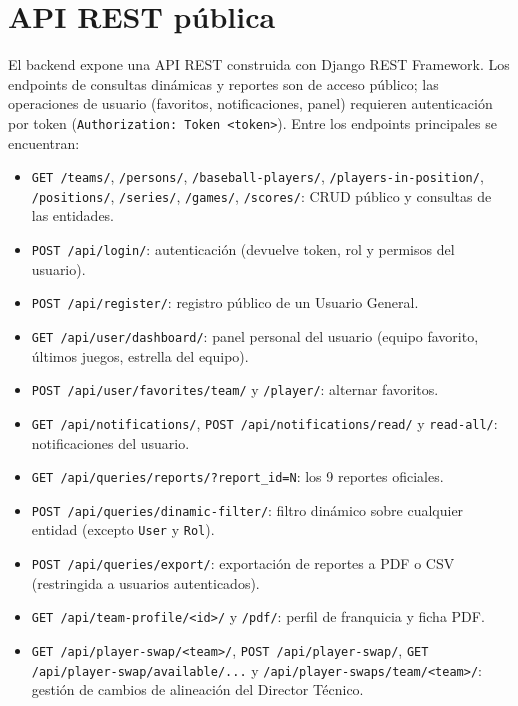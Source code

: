 \documentclass{report}
\begin{document}
    \section*{API REST pública}
    El backend expone una API REST construida con Django REST Framework. Los endpoints de consultas
    dinámicas y reportes son de acceso público; las operaciones de usuario (favoritos, notificaciones,
    panel) requieren autenticación por token (\texttt{Authorization: Token <token>}). Entre los endpoints
    principales se encuentran:

    \begin{itemize}
        \item \texttt{GET /teams/}, \texttt{/persons/}, \texttt{/baseball-players/},
        \texttt{/players-in-position/}, \texttt{/positions/}, \texttt{/series/}, \texttt{/games/},
        \texttt{/scores/}: CRUD público y consultas de las entidades.
        \item \texttt{POST /api/login/}: autenticación (devuelve token, rol y permisos del usuario).
        \item \texttt{POST /api/register/}: registro público de un Usuario General.
        \item \texttt{GET /api/user/dashboard/}: panel personal del usuario (equipo favorito, últimos
        juegos, estrella del equipo).
        \item \texttt{POST /api/user/favorites/team/} y \texttt{/player/}: alternar favoritos.
        \item \texttt{GET /api/notifications/}, \texttt{POST /api/notifications/read/} y \texttt{read-all/}:
        notificaciones del usuario.
        \item \texttt{GET /api/queries/reports/?report\_id=N}: los 9 reportes oficiales.
        \item \texttt{POST /api/queries/dinamic-filter/}: filtro dinámico sobre cualquier entidad
        (excepto \texttt{User} y \texttt{Rol}).
        \item \texttt{POST /api/queries/export/}: exportación de reportes a PDF o CSV (restringida a
        usuarios autenticados).
        \item \texttt{GET /api/team-profile/<id>/} y \texttt{/pdf/}: perfil de franquicia y ficha PDF.
        \item \texttt{GET /api/player-swap/<team>/}, \texttt{POST /api/player-swap/},
        \texttt{GET /api/player-swap/available/...} y \texttt{/api/player-swaps/team/<team>/}: gestión de
        cambios de alineación del Director Técnico.
    \end{itemize}
\end{document}
